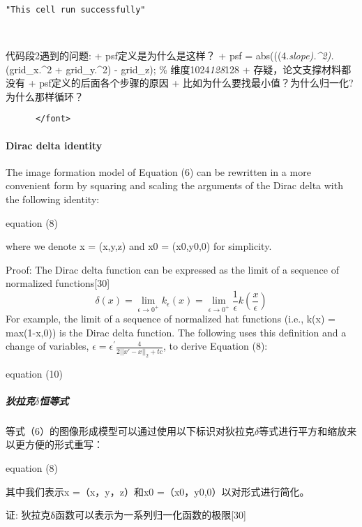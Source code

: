 \documentclass[11pt]{article}
\begin{document}
    \begin{Verbatim}[commandchars=\\\{\}]
    "This cell run successfully"



    \end{Verbatim}

    代码段2遇到的问题: + psf定义是为什么是这样？ + psf =
abs(((4.\emph{slope).\^{}2).}(grid\_x.\^{}2 + grid\_y.\^{}2) - grid\_z);
\% 维度1024\emph{128}128 + 存疑，论文支撑材料都没有 +
psf定义的后面各个步骤的原因 +
比如为什么要找最小值？为什么归一化?为什么那样循环？

\begin{verbatim}
      </font>
\end{verbatim}

    \paragraph{Dirac delta identity}\label{dirac-delta-identity}

The image formation model of Equation (6) can be rewritten in a more
convenient form by squaring and scaling the arguments of the Dirac delta
with the following identity:

 equation (8)

where we denote x = (x,y,z) and x0 = (x0,y0,0) for simplicity.

Proof: The Dirac delta function can be expressed as the limit of a
sequence of normalized functions{[}30{]}
\[\delta(x)=\lim_{\epsilon \to 0^{+}}k_{\epsilon}(x)=\lim_{\epsilon \to 0^{+}}\frac{1}{\epsilon}k(\frac{x}{\epsilon})\]
For example, the limit of a sequence of normalized hat functions (i.e.,
k(x) = max(1-\textbar{}x\textbar{},0)) is the Dirac delta function. The
following uses this definition and a change of variables,
\(\epsilon=\epsilon^{'}\frac{4}{2||x'-x||_{2}+tc}\), to derive Equation
(8):

 equation (10)

    \subparagraph{\texorpdfstring{狄拉克\(\delta\)恒等式}{狄拉克\textbackslash{}delta恒等式}}\label{ux72c4ux62c9ux514bdeltaux6052ux7b49ux5f0f}

等式（6）的图像形成模型可以通过使用以下标识对狄拉克\(\delta\)等式进行平方和缩放来以更方便的形式重写：

 equation (8)

其中我们表示x =（x，y，z）和x0 =（x0，y0,0）以对形式进行简化。

证: 狄拉克δ函数可以表示为一系列归一化函数的极限{[}30{]}
\end{document}
